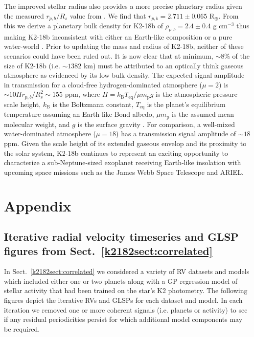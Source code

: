 The improved stellar radius also provides a more precise planetary radius given the measured $r_{p,b}/R_s$
value from \cite{benneke17}.
We find that $r_{p,b}=2.711 \pm 0.065$ R$_{\oplus}$. From this we derive a planetary
bulk density for K2-18b of $\rho_{p,b}=2.4\pm 0.4$ g cm$^{-3}$ thus making K2-18b inconsistent with either an
Earth-like composition or a pure water-world \citep{zeng13}. Prior to updating the mass and radius of K2-18b,
neither of these scenarios could have been ruled out. It is now clear that at minimum, $\sim 8$\% of the size of
K2-18b (i.e. $\sim 1382$ km) must be attributed to an optically think gaseous atmosphere as evidenced by its
low bulk density. The expected signal amplitude in transmission for a cloud-free hydrogen-dominated atmosphere
($\mu=2$) is $\sim 10Hr_{p,b}/R_s^2\sim 155$ ppm,
where $H=k_{\text{B}}T_{\text{eq}}/\mu m_{\text{p}} g$ is the atmospheric pressure scale
height, $k_{\text{B}}$ is the Boltzmann constant, $T_{\text{eq}}$ is the planet's equilibrium temperature assuming
an Earth-like Bond albedo, $\mu m_{\text{p}}$ is the assumed mean molecular weight, and $g$ is the surface gravity 
\citep{kaltenegger09}. For comparison, a well-mixed water-dominated atmosphere ($\mu=18$) has a transmission signal
amplitude of $\sim 18$ ppm. Given the scale height of its extended gaseous envelop and its proximity to the solar
system, K2-18b continues to represent an exciting opportunity
to characterize a sub-Neptune-sized exoplanet receiving Earth-like insolation with upcoming space missions such
as the James Webb Space Telescope and ARIEL.


\section{Appendix}
\subsection{Iterative radial velocity timeseries and GLSP figures from Sect.~\ref{k2182sect:correlated}}
In Sect.~\ref{k2182sect:correlated} we considered a variety of RV datasets and models which included either
one or two planets along with a GP regression model of stellar activity that had been trained on the star's
K2 photometry. The following figures depict the iterative RVs and GLSPs for each dataset and model. In
each iteration we removed one or more coherent signals (i.e. planets or activity) to see if any residual
periodicities persist for which additional model components may be required.


